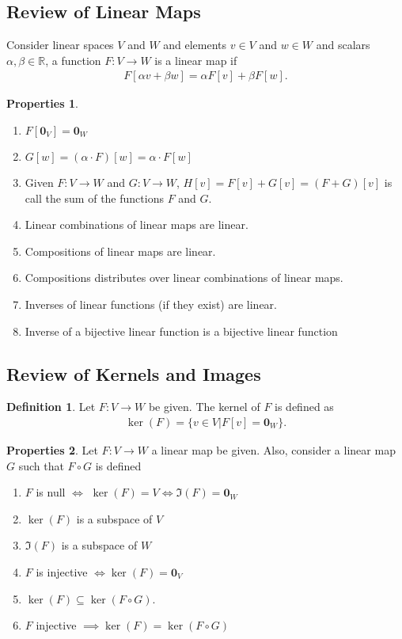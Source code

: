 \documentclass{article}
\theoremstyle{definition}
\newtheorem{defn}{Definition}[section]
\newtheorem{prop}{Properties}[section]
\newcommand{\R}{\mathbb{R}}
\begin{document}
\subsection{Review of Linear Maps}
Consider linear spaces $V$ and $W$ and elements $v \in V$ and $w \in W$ and scalars $\alpha, \beta \in \R$, a function $F : V \rightarrow W$ is a linear map if
\begin{align*}
F[\alpha v + \beta w] = \alpha F[v] + \beta F[w].
\end{align*}
\begin{prop}
	$\,$
\begin{enumerate}
	\item $F[\mathbf{0}_V] = \mathbf{0}_W$
	\item $G[w] = (\alpha \cdot F)[w] = \alpha\cdot F[w]$
	\item Given $F : V \rightarrow W$ and $G : V \rightarrow W$, $H[v] = F[v] + G[v] = (F+G)[v]$ is call the sum of the functions $F$ and $G$.
	\item Linear combinations of linear maps are linear.
	\item Compositions of linear maps are linear. 
	\item Compositions distributes over linear combinations of linear maps.
	\item Inverses of linear functions (if they exist) are linear.
	\item Inverse of a bijective linear function is a bijective linear function
\end{enumerate}
\end{prop}
\subsection{Review of Kernels and Images}
\begin{defn}
	Let $F : V \rightarrow W$ be given. The kernel of $F$ is defined as
	\begin{align*}
	\ker(F) = \{v\in V \vert F[v] = \mathbf{0}_W\}.
	\end{align*}
\end{defn}
\begin{prop}
	Let $F : V \rightarrow W$ a linear map be given. Also, consider a linear map $G$ such that $F\circ G$ is defined 
	\begin{enumerate}
		\item $F$ is null $\iff$ $\ker(F) = V \iff \Im(F) = \mathbf{0}_W $
		\item $\ker(F)$ is a subspace of $V$
		\item $\Im(F)$ is a subspace of $W$
		\item $F$ is injective $\iff \ker(F) = \mathbf{0}_V$
		\item $\ker(F) \subseteq \ker(F\circ G)$.
		\item $F$ injective $\implies \ker(F) = \ker(F\circ G)$
	\end{enumerate}
\end{prop}
\end{document}
